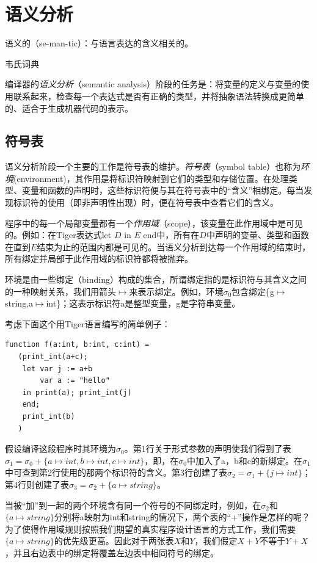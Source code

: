 \documentclass[cn,11pt,chinese]{elegantbook}
\begin{document}
\chapter{语义分析}

\epigraph{语义的（se-man-tic）：与语言表达的含义相关的。}{韦氏词典}

编译器的\textit{语义分析}（semantic analysis）阶段的任务是：将变量的定义与变量的使用联系起来，检查每一个表达式是否有正确的类型，并将抽象语法转换成更简单的、适合于生成机器代码的表示。

\section{符号表}

语义分析阶段一个主要的工作是符号表的维护。\textit{符号表}（symbol table）也称为\textit{环境}(environment)，其作用是将标识符映射到它们的类型和存储位置。在处理类型、变量和函数的声明时，这些标识符便与其在符号表中的“含义”相绑定。每当发现标识符的使用（即非声明性出现）时，便在符号表中查看它们的含义。

程序中的每一个局部变量都有一个\textit{作用域}（scope），该变量在此作用域中是可见的。例如：在Tiger表达式let $D$ in $E$ end中，所有在$D$中声明的变量、类型和函数在直到$E$结束为止的范围内都是可见的。当语义分析到达每一个作用域的结束时，所有绑定并局部于此作用域的标识符都将被抛弃。

环境是由一些绑定（binding）构成的集合，所谓绑定指的是标识符与其含义之间的一种映射关系，我们用箭头$\mapsto$来表示绑定。例如，环境$\sigma_0$包含绑定\{g$\mapsto$string,a$\mapsto$int\}；这表示标识符a是整型变量，g是字符串变量。

考虑下面这个用Tiger语言编写的简单例子：

\begin{lstlisting}
function f(a:int, b:int, c:int) =
   (print_int(a+c);
    let var j := a+b
        var a := "hello"
    in print(a); print_int(j)
    end;
    print_int(b)
   )
\end{lstlisting}

假设编译这段程序时其环境为$\sigma_0$。第1行关于形式参数的声明使我们得到了表$\sigma_1 = \sigma_0 + \{a\mapsto int,b\mapsto int, c\mapsto int\}$，即，在$\sigma_0$中加入了a，b和c的新绑定。在$\sigma_1$中可查到第2行使用的那两个标识符的含义。第3行创建了表$\sigma_2=\sigma_1+\{j\mapsto int\}$；第4行则创建了表$\sigma_3=\sigma_2+\{a\mapsto string\}$。

当被“加”到一起的两个环境含有同一个符号的不同绑定时，例如，在$\sigma_2$和$\{a\mapsto string\}$分别将a映射为int和string的情况下，两个表的“+”操作是怎样的呢？为了使得作用域规则按照我们期望的真实程序设计语言的方式工作，我们需要$\{a\mapsto string\}$的优先级更高。因此对于两张表$X$和$Y$，我们假定$X+Y$不等于$Y+X$，并且右边表中的绑定将覆盖左边表中相同符号的绑定。
\end{document}
